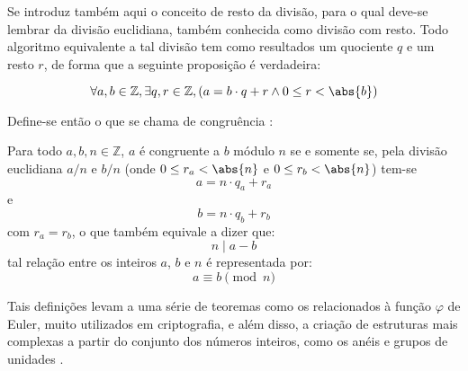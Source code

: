 Se introduz também aqui o conceito de resto da divisão, para o qual deve-se lembrar da divisão euclidiana, também conhecida como divisão com resto. Todo algoritmo equivalente a tal divisão tem como resultados um quociente $q$ e um resto $r$, de forma que a seguinte proposição é verdadeira:

\begin{equation*}
        \forall a, b \in \mathbb{Z}, \exists q, r \in \mathbb{Z}, (a = b \cdot q + r \land 0 \leq r < \abs{b})
\end{equation*}

Define-se então o que se chama de congruência \cite{book:2399854}:

\begin{definição}
    Para todo $a, b, n \in \mathbb{Z}$, $a$ é congruente a $b$ módulo $n$ se e somente se, pela divisão euclidiana $a/n$ e $b/n$ (onde $0 \leq r_a < \abs{n}$ e $0 \leq r_b < \abs{n}$) tem-se
    \begin{equation*}
        a = n \cdot q_a + r_a
    \end{equation*}
    e
    \begin{equation*}
        b = n \cdot q_b + r_b
    \end{equation*}
    com $r_a = r_b$, o que também equivale a dizer que:
    \begin{equation*}
        n \mid a - b
    \end{equation*}
    tal relação entre os inteiros $a$, $b$ e $n$ é representada por:
    \begin{equation*}
        a \equiv b \pmod{n}
    \end{equation*}
\end{definição}

Tais definições levam a uma série de teoremas como os relacionados à função $\varphi$ de Euler, muito utilizados em criptografia, e além disso, a criação de estruturas mais complexas a partir do conjunto dos números inteiros, como os anéis e grupos de unidades \cite{book:2399854}.

